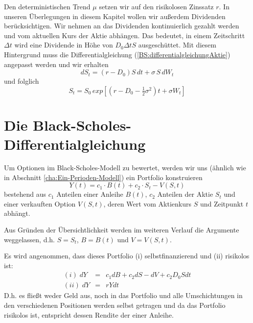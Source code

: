 Den deterministischen Trend $\mu$ setzen wir auf den risikolosen Zinssatz $r$. In unseren Überlegungen in diesem Kapitel wollen wir außerdem Dividenden berücksichtigen. Wir nehmen an das Dividenden kontinuierlich gezahlt werden und vom aktuellen Kurs der Aktie abhängen. Das bedeutet, in einem Zeitschritt $\Delta t$ wird eine Dividende in Höhe von $D_0\Delta t S$ ausgeschüttet. 
Mit diesem Hintergrund muss die Differentialgleichung (\ref{BS:differentialgleichungAktie}) angepasst werden und wir erhalten
\begin{equation}
dS_t = \left(r-D_0\right)S\,dt  + \sigma\,S\,dW_t\label{BS:differentialgleichungAktieDividende}  
\end{equation}
und folglich 
\begin{equation}
S_t = S_0\,exp\left[ \left(r - D_0 - \tfrac{1}{2}\sigma^2\right)t + \sigma W_t\right] \label{BS:aktienkursDividende}
\end{equation}


\section{Die Black-Scholes-Differentialgleichung}        %
Um Optionen im Black-Scholes-Modell zu bewertet, werden wir uns (ähnlich wie in Abschnitt \ref{cha:Ein-Perioden-Modell}) ein Portfolio konstruieren
\begin{equation}
Y(t) = c_1 \cdot B(t) + c_2 \cdot S_t - V(S,t) \label{BS:portfolio}
\end{equation}
bestehend aus $c_1$ Anteilen einer Anleihe $B(t)$, $c_2$ Anteilen der Aktie $S_t$ und einer verkauften Option $V(S,t)$, deren Wert vom Aktienkurs $S$ und Zeitpunkt $t$ abhängt.
\begin{Bemerkung}
Aus Gründen der Übersichtlichkeit werden im weiteren Verlauf die Argumente weggelassen, d.h. $S=S_t$, $B=B(t)$ und $V=V(S,t)$.
\end{Bemerkung}

Es wird angenommen, dass dieses Portfolio (i) selbstfinanzierend und (ii) risikolos ist:
\begin{eqnarray}
(i)  \; dY & = & c_1 dB + c_2 dS - dV + c_2 D_0 S dt \label{BS:annahmeSelbstfinanzierend}\\
(ii) \; dY & = & rYdt \label{BS:annahmeRisikolos}
\end{eqnarray}
D.h. es fließt weder Geld aus, noch in das Portfolio und alle Umschichtungen in den verschiedenen Positionen werden selbst getragen und da das Portfolio risikolos ist, entspricht dessen Rendite der einer Anleihe.


